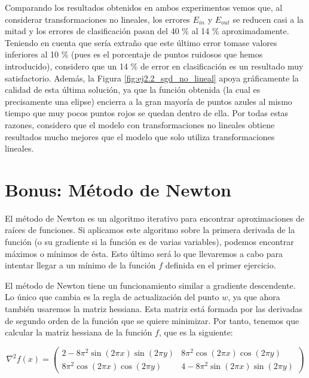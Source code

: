 \documentclass[10pt,a4paper]{article}
\begin{document}
Comparando los resultados obtenidos en ambos experimentos vemos que, al considerar transformaciones no lineales, los errores $E_{in}$ y $E_{out}$ se reducen casi a la mitad y los errores de clasificación pasan del 40 \% al 14 \% aproximadamente. Teniendo en cuenta que sería extraño que este último error tomase valores inferiores al 10 \% (pues es el porcentaje de puntos ruidosos que hemos introducido), considero que un 14 \% de error en clasificación es un resultado muy satisfactorio. Además, la Figura \ref{fig:ej2.2_sgd_no_lineal} apoya gráficamente la calidad de esta última solución, ya que la función obtenida (la cual es precisamente una elipse) encierra a la gran mayoría de puntos azules al mismo tiempo que muy pocos puntos rojos se quedan dentro de ella. Por todas estas razones, considero que el modelo con transformaciones no lineales obtiene resultados mucho mejores que el modelo que solo utiliza transformaciones lineales.







\newpage

\section{Bonus: Método de Newton}

El método de Newton es un algoritmo iterativo para encontrar aproximaciones de raíces de funciones. Si aplicamos este algoritmo sobre la primera derivada de la función (o su gradiente si la función es de varias variables), podemos encontrar máximos o mínimos de ésta. Esto último será lo que llevaremos a cabo para intentar llegar a un mínimo de la función $f$ definida en el primer ejercicio.

El método de Newton tiene un funcionamiento similar a gradiente descendente. Lo único que cambia es la regla de actualización del punto $w$, ya que ahora también usaremos la matriz hessiana. Esta matriz está formada por las derivadas de segundo orden de la función que se quiere minimizar. Por tanto, tenemos que calcular la matriz hessiana de la función $f$, que es la siguiente:

\begin{equation}
	\nabla^2 f(x) = 
	\left(
	\begin{matrix}
		2-8 \pi^2 \sin(2 \pi x) \sin(2 \pi y) & 8 \pi^2 \cos(2 \pi x) \cos(2 \pi y)\\
		8 \pi^2 \cos(2 \pi x) \cos(2 \pi y) & 4-8 \pi^2 \sin(2 \pi x) \sin(2 \pi y)
	\end{matrix}
	\right)
\end{equation}
\end{document}

